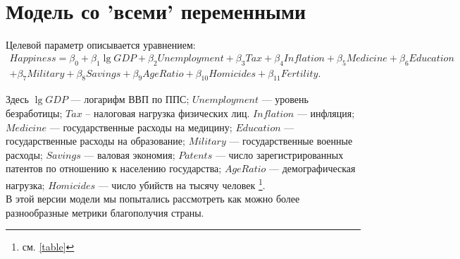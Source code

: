 \documentclass[russian]{vegareport}
\begin{document}
        \section{Модель со 'всеми' переменными}
        Целевой параметр описывается уравнением:
        \begin{align*}
        Happiness = \beta_0 + \beta_1 \lg{GDP} + \beta_2 Unemployment + \beta_3 Tax + \beta_4 Inflation + \beta_5 Medicine + \beta_6 Education \\
            + \beta_7 Military + \beta_8 Savings + \beta_{9} AgeRatio + \beta_{10} Homicides + \beta_{11} Fertility.
        \end{align*}

        Здесь $\lg{GDP}$ --- логарифм ВВП по ППС; $Unemployment$ --- уровень безработицы; 
        $Tax$ -- налоговая нагрузка физических лиц. $Inflation$ --- инфляция; 
        $Medicine$ --- государственные расходы на медицину; $Education$ --- государственные расходы на образование; 
        $Military$ --- государственные военные расходы; $Savings$ --- валовая экономия; 
        $Patents$ --- число зарегистрированных патентов по отношению к населению государства; 
        $AgeRatio$ --- демографическая нагрузка; $Homicides$ --- число убийств на тысячу человек \footnote{см. \ref{table}}.
        \\
        В этой версии модели мы попытались рассмотреть как можно более разнообразные метрики благополучия страны.
    
    
\end{document}
